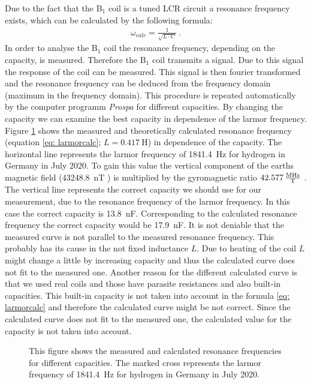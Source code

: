 Due to the fact that the B$_1$ coil is a tuned LCR circuit a resonance frequency exists, which can be calculated by the following formula:
\begin{align}
    \omega_{calc} = \frac{1}{\sqrt{L \cdot C}} \ .
    \label{eq: larmorcalc}
\end{align}
In order to analyse the B$_1$ coil the resonance frequency, depending on the capacity, is measured.
Therefore the B$_1$ coil transmits a signal.
Due to this signal the response of the coil can be measured.
This signal is then fourier transformed and the resonance frequency can be deduced from the frequency domain (maximum in the frequency domain).
This procedure is repeated automatically by the computer programm \textit{Prospa} for different capacities.
By changing the capacity we can examine the best capacity in dependence of the larmor frequency.
Figure \ref{fig: Coilanalyse} shows the measured and theoretically calculated resonance frequency (equation \eqref{eq: larmorcalc}; $L = \SI{0.417}{\henry}$) in dependence of the capacity.
The horizontal line represents the larmor frequency of \SI{1841.4}{\hertz} for hydrogen in Germany in July 2020.
To gain this value the vertical component of the earths magnetic field (\SI{43248.8}{\nano \tesla} \cite{magnetfeld}) is multiplied by the gyromagnetic ratio $\SI{42.577}{\frac{\mega \hertz}{\tesla}}$ \cite{magnetfeld}.
The vertical line represents the correct capacity we should use for our measurement, due to the resonance frequency of the larmor frequency.
In this case the correct capacity is \SI{13.8}{\nano \farad}.
Corresponding to the calculated resonance frequency the correct capacity would be \SI{17.9}{\nano \farad}.
It is not deniable that the measured curve is not parallel to the measured resonance frequency.
This probably has its cause in the not fixed inductance $L$.
Due to heating of the coil $L$ might change a little by increasing capacity and thus the calculated curve does not fit to the measured one.
Another reason for the different calculated curve is that we used real coils and those have parasite resistances and also built-in capacities.
This built-in capacity is not taken into account in the formula \eqref{eq: larmorcalc} and therefore the calculated curve might be not correct.
Since the calculated curve does not fit to the measured one, the calculated value for the capacity is not taken into account.

\begin{figure}[H]
    \centering
    
    \caption[This figure shows the measured and calculated resonance frequencies for different capacities.]{This figure shows the measured and calculated resonance frequencies for different capacities.
    The marked cross represents the larmor frequency of \SI{1841.4}{\hertz} for hydrogen in Germany in July 2020.}
    \label{fig: Coilanalyse}
\end{figure}